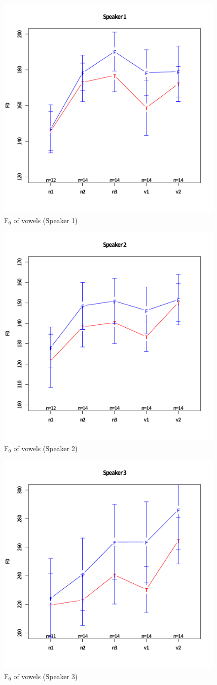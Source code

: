 \begin{figure}
	\begin{center}
	\includegraphics[width=.5\textwidth]{figure/yomiage01.pdf}
	\caption{F$_{0}$ of vowels (Speaker 1)}
	\label{Int:fig:Sp1}
	\end{center}
\end{figure}
\begin{figure}
	\begin{center}
	\includegraphics[width=.5\textwidth]{figure/yomiage02.pdf}
	\caption{F$_{0}$ of vowels (Speaker 2)}
	\label{Int:fig:Sp2}
	\end{center}
\end{figure}
\begin{figure}
	\begin{center}
	\includegraphics[width=.5\textwidth]{figure/yomiage03.pdf}
	\caption{F$_{0}$ of vowels (Speaker 3)}
	\label{Int:fig:Sp3}
	\end{center}
\end{figure}
